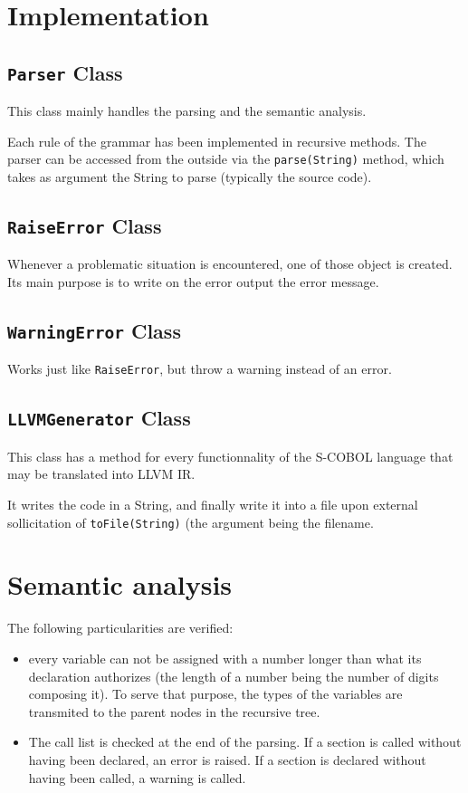 \documentclass[a4paper,11pt]{article}
\newcounter{rule}
\begin{document}
\section{Implementation}
\subsection{\texttt{Parser} Class}
This class mainly handles the parsing and the semantic analysis.

Each rule of the grammar has been implemented in recursive methods.
The parser can be accessed from the outside via the \texttt{parse(String)}
method, which takes as argument the String to parse (typically the source
code).

\subsection{\texttt{RaiseError} Class}
Whenever a problematic situation is encountered, one of those object is created.
Its main purpose is to write on the error output the error message.

\subsection{\texttt{WarningError} Class}
Works just like \texttt{RaiseError}, but throw a warning instead of an error.

\subsection{\texttt{LLVMGenerator} Class}
This class has a method for every functionnality of the S-COBOL language
that may be translated into LLVM IR.

It writes the code in a String, and finally write it into a file
upon external sollicitation of \texttt{toFile(String)} (the argument being
the filename.

\section{Semantic analysis}
The following particularities are verified:
\begin{itemize}
	\item every variable can not be assigned with a number longer than
		what its declaration authorizes (the length of a number being
		the number of digits composing it). To serve that purpose,
		the types of the variables are transmited to the parent nodes
		in the recursive tree.
	\item The call list is checked at the end of the parsing. If a section
		is called without having been declared, an error is raised. If a
		section is declared without having been called, a warning is
		called.
\end{itemize}
\end{document}

